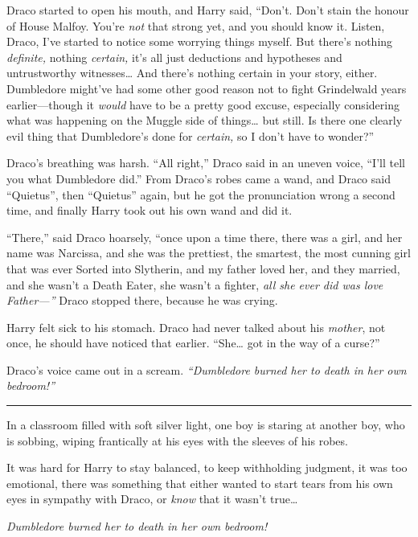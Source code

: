 Draco started to open his mouth, and Harry said, ``Don't. Don't stain
the honour of House Malfoy. You're \emph{not} that strong yet, and you
should know it. Listen, Draco, I've started to notice some worrying
things myself. But there's nothing \emph{definite,} nothing
\emph{certain,} it's all just deductions and hypotheses and
untrustworthy witnesses\ldots{} And there's nothing certain in your
story, either. Dumbledore might've had some other good reason not to
fight Grindelwald years earlier---though it \emph{would} have to be a
pretty good excuse, especially considering what was happening on the
Muggle side of things\ldots{} but still. Is there one clearly evil thing
that Dumbledore's done for \emph{certain,} so I don't have to wonder?''

Draco's breathing was harsh. ``All right,'' Draco said in an uneven
voice, ``I'll tell you what Dumbledore did.'' From Draco's robes came a
wand, and Draco said ``Quietus'', then ``Quietus'' again, but he got the
pronunciation wrong a second time, and finally Harry took out his own
wand and did it.

``There,'' said Draco hoarsely, ``once upon a time there, there was a
girl, and her name was Narcissa, and she was the prettiest, the
smartest, the most cunning girl that was ever Sorted into Slytherin, and
my father loved her, and they married, and she wasn't a Death Eater, she
wasn't a fighter, \emph{all she ever did was love Father---''} Draco
stopped there, because he was crying.

Harry felt sick to his stomach. Draco had never talked about his
\emph{mother}, not once, he should have noticed that earlier.
``She\ldots{} got in the way of a curse?''

Draco's voice came out in a scream. \emph{``Dumbledore burned her to
death in her own bedroom!''}

\begin{center}\rule{3in}{0.4pt}\end{center}

In a classroom filled with soft silver light, one boy is staring at
another boy, who is sobbing, wiping frantically at his eyes with the
sleeves of his robes.

It was hard for Harry to stay balanced, to keep withholding judgment, it
was too emotional, there was something that either wanted to start tears
from his own eyes in sympathy with Draco, or \emph{know} that it wasn't
true\ldots{}

\emph{Dumbledore burned her to death in her own bedroom!}

